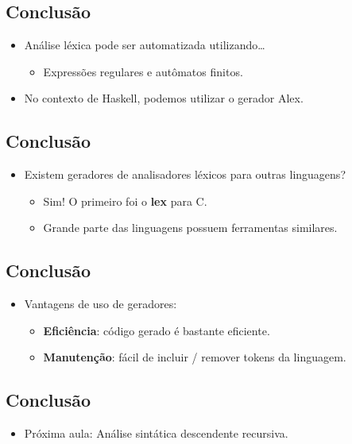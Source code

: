 \documentclass[11pt]{article}
\begin{document}
\subsection*{Conclusão}
\label{sec:orgaf2e72d}

\begin{itemize}
\item Análise léxica pode ser automatizada utilizando\ldots{}
\begin{itemize}
\item Expressões regulares e autômatos finitos.
\end{itemize}

\item No contexto de Haskell, podemos utilizar o gerador Alex.
\end{itemize}
\subsection*{Conclusão}
\label{sec:orgdd170a6}

\begin{itemize}
\item Existem geradores de analisadores léxicos para outras linguagens?
\begin{itemize}
\item Sim! O primeiro foi o \textbf{\textbf{lex}} para C.
\item Grande parte das linguagens possuem ferramentas similares.
\end{itemize}
\end{itemize}
\subsection*{Conclusão}
\label{sec:orgccdbc9c}

\begin{itemize}
\item Vantagens de uso de geradores:
\begin{itemize}
\item \textbf{\textbf{Eficiência}}: código gerado é bastante eficiente.
\item \textbf{\textbf{Manutenção}}: fácil de incluir / remover tokens da linguagem.
\end{itemize}
\end{itemize}
\subsection*{Conclusão}
\label{sec:org51b19db}

\begin{itemize}
\item Próxima aula: Análise sintática descendente recursiva.
\end{itemize}
\end{document}

